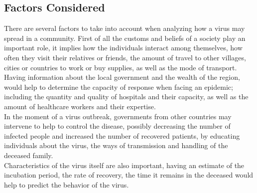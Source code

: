 

\subsection{Factors Considered}
There are several factors to take into account when analyzing how a virus may spread in a community. First of all the customs and beliefs of a society play an important role, it implies how the individuals interact among themselves, how often they visit their relatives or friends, the amount of travel to other villages, cities or countries to work or buy supplies, as well as the mode of transport.\\
Having information about the local government and the wealth of the region, would help to determine the capacity of response when facing an epidemic; including the quantity and quality of hospitals and their capacity, as well as the amount of healthcare workers and their expertise.\\
In the moment of a virus outbreak, governments from other countries may intervene to help to control the disease, possibly decreasing the number of infected people and increased the number of recovered patients, by educating individuals about the virus, the ways of transmission and handling of the deceased family. \\
Characteristics of the virus itself are also important, having an estimate of the incubation period, the rate of recovery, the time it remains in the deceased would help to predict the behavior of the virus.\\


